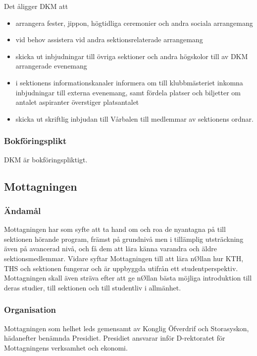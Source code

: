 \documentclass{dgovdoc}
\begin{document}
Det åligger DKM att

\begin{itemize}
  \item arrangera fester, jippon, högtidliga ceremonier och andra sociala
    arrangemang
  \item vid behov assistera vid andra sektionsrelaterade arrangemang
  \item skicka ut inbjudningar till övriga sektioner och andra högskolor till
    av DKM arrangerade evenemang
  \item i sektionens informationskanaler informera om till klubbmästeriet
    inkomna inbjudningar till externa evenemang, samt fördela platser och
    biljetter om antalet aspiranter överstiger platsantalet
  \item skicka ut skriftlig inbjudan till Vårbalen till medlemmar av sektionens
    ordnar.
\end{itemize}

\subsubsection{Bokföringsplikt}

DKM är bokföringspliktigt.

\subsection{Mottagningen}

\subsubsection{Ändamål}

Mottagningen har som syfte att ta hand om och roa de nyantagna på till
sektionen hörande program, främst på grundnivå men i tillämplig utsträckning
även på avancerad nivå, och få dem att lära känna varandra och äldre
sektionsmedlemmar. Vidare syftar Mottagningen till att lära nØllan hur KTH, THS
och sektionen fungerar och är uppbyggda utifrån ett studentperspektiv.
Mottagningen skall även sträva efter att ge nØllan bästa möjliga introduktion
till deras studier, till sektionen och till studentliv i allmänhet.

\subsubsection{Organisation}

Mottagningen som helhet leds gemensamt av Konglig Öfverdrif och Storasyskon, hädanefter 
benämnda Presidiet. Presidiet ansvarar inför D-rektoratet för Mottagningens verksamhet och ekonomi.
\end{document}
